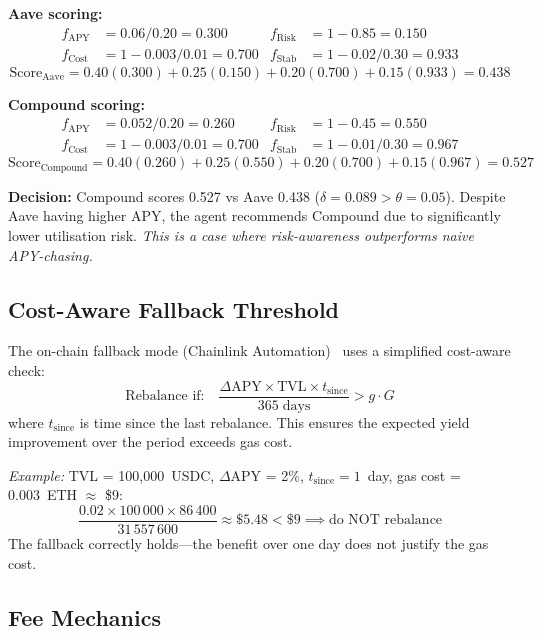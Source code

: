 \documentclass[12pt]{article}
\begin{document}
\textbf{Aave scoring:}
\begin{align*}
  f_{\text{APY}} &= 0.06 / 0.20 = 0.300 &
  f_{\text{Risk}} &= 1 - 0.85 = 0.150 \\
  f_{\text{Cost}} &= 1 - 0.003 / 0.01 = 0.700 &
  f_{\text{Stab}} &= 1 - 0.02 / 0.30 = 0.933
\end{align*}
\[
  \text{Score}_{\text{Aave}} = 0.40(0.300) + 0.25(0.150) + 0.20(0.700) + 0.15(0.933) = \mathbf{0.438}
\]

\textbf{Compound scoring:}
\begin{align*}
  f_{\text{APY}} &= 0.052 / 0.20 = 0.260 &
  f_{\text{Risk}} &= 1 - 0.45 = 0.550 \\
  f_{\text{Cost}} &= 1 - 0.003 / 0.01 = 0.700 &
  f_{\text{Stab}} &= 1 - 0.01 / 0.30 = 0.967
\end{align*}
\[
  \text{Score}_{\text{Compound}} = 0.40(0.260) + 0.25(0.550) + 0.20(0.700) + 0.15(0.967) = \mathbf{0.527}
\]

\textbf{Decision:} Compound scores 0.527 vs Aave 0.438 ($\delta = 0.089 > \theta = 0.05$).
Despite Aave having higher APY, the agent recommends Compound due to significantly lower utilisation risk.
\emph{This is a case where risk-awareness outperforms naive APY-chasing.}

\subsection{Cost-Aware Fallback Threshold}
\label{sec:chainlink}

The on-chain fallback mode (Chainlink Automation)~\cite{chainlink} uses a simplified cost-aware check:
\begin{equation}
  \text{Rebalance if:} \quad \frac{\Delta\text{APY} \times \text{TVL} \times t_{\text{since}}}{365 \;\text{days}} > g \cdot G
  \label{eq:fallback}
\end{equation}
where $t_{\text{since}}$ is time since the last rebalance.
This ensures the expected yield improvement over the period exceeds gas cost.

\emph{Example:} TVL = 100{,}000~USDC, $\Delta$APY = 2\%, $t_{\text{since}} = 1$~day, gas cost = 0.003~ETH $\approx$ \$9:
\[
  \frac{0.02 \times 100\,000 \times 86\,400}{31\,557\,600} \approx \$5.48 < \$9 \implies \text{do NOT rebalance}
\]
The fallback correctly holds---the benefit over one day does not justify the gas cost.

\subsection{Fee Mechanics}
\end{document}
